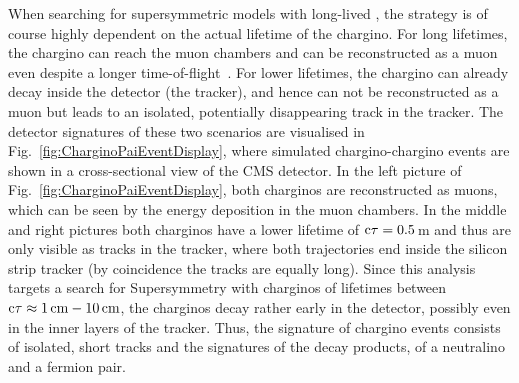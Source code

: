When searching for supersymmetric models with long-lived \chipm, the strategy is of course highly dependent on the actual lifetime of the chargino. 
For long lifetimes, the chargino can reach the muon chambers and can be reconstructed as a muon even despite a longer time-of-flight~\cite{bib:CMS:HSCP_7TeV}. 
For lower lifetimes, the chargino can already decay inside the detector (\eg the tracker), and hence can not be reconstructed as a muon but leads to an isolated, potentially disappearing track in the tracker. 
The detector signatures of these two scenarios are visualised in Fig.~\ref{fig:CharginoPaiEventDisplay}, where simulated chargino-chargino events are shown in a cross-sectional view of the CMS detector.
In the left picture of Fig.~\ref{fig:CharginoPaiEventDisplay}, both charginos are reconstructed as muons, which can be seen by the energy deposition in the muon chambers.
In the middle and right pictures both charginos have a lower lifetime of $\text{c}\tau=0.5\,$m and thus are only visible as tracks in the tracker, where both trajectories end inside the silicon strip tracker (by coincidence the tracks are equally long).
Since this analysis targets a search for Supersymmetry with charginos of lifetimes between $\text{c}\tau \approx 1\,\text{cm} - 10\,\text{cm}$, the charginos decay rather early in the detector, possibly even in the inner layers of the tracker.
Thus, the signature of chargino events consists of isolated, short tracks and the signatures of the decay products, \ie of a neutralino and a fermion pair. 
